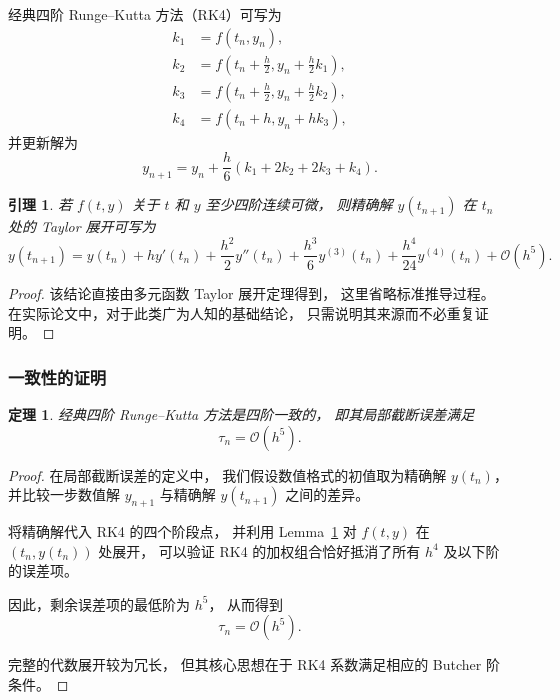 \documentclass[UTF8, a4paper, zihao=-4]{ctexart} %
\newtheorem{theorem}{定理}[section]%
\newtheorem{lemma}{引理}[section]
\numberwithin{equation}{section}%
\begin{document}
经典四阶 Runge--Kutta 方法（RK4）可写为
\begin{align}
k_1 &= f(t_n, y_n), \\
k_2 &= f\left(t_n + \tfrac{h}{2}, y_n + \tfrac{h}{2} k_1 \right), \\
k_3 &= f\left(t_n + \tfrac{h}{2}, y_n + \tfrac{h}{2} k_2 \right), \\
k_4 &= f\left(t_n + h, y_n + h k_3 \right),
\end{align}
并更新解为
\begin{equation}
y_{n+1} = y_n + \frac{h}{6}(k_1 + 2k_2 + 2k_3 + k_4).
\end{equation}

\begin{lemma}
\label{lem:taylor}
若 $f(t,y)$ 关于 $t$ 和 $y$ 至少四阶连续可微，
则精确解 $y(t_{n+1})$ 在 $t_n$ 处的 Taylor 展开可写为
\[
y(t_{n+1}) = y(t_n) + h y'(t_n) + \frac{h^2}{2} y''(t_n)
+ \frac{h^3}{6} y^{(3)}(t_n)
+ \frac{h^4}{24} y^{(4)}(t_n)
+ \mathcal{O}(h^5).
\]
\end{lemma}

\begin{proof}
该结论直接由多元函数 Taylor 展开定理得到，
这里省略标准推导过程。
在实际论文中，对于此类广为人知的基础结论，
只需说明其来源而不必重复证明。
\end{proof}

\subsubsection*{一致性的证明}

\begin{theorem}
\label{thm:rk4_consistency}
经典四阶 Runge--Kutta 方法是四阶一致的，
即其局部截断误差满足
\[
\tau_n = \mathcal{O}(h^5).
\]
\end{theorem}

\begin{proof}
在局部截断误差的定义中，
我们假设数值格式的初值取为精确解 $y(t_n)$，
并比较一步数值解 $y_{n+1}$ 与精确解 $y(t_{n+1})$ 之间的差异。

将精确解代入 RK4 的四个阶段点，
并利用 Lemma~\ref{lem:taylor} 对 $f(t,y)$ 在 $(t_n, y(t_n))$ 处展开，
可以验证 RK4 的加权组合恰好抵消了所有 $h^4$ 及以下阶的误差项。

因此，剩余误差项的最低阶为 $h^5$，
从而得到
\[
\tau_n = \mathcal{O}(h^5).
\]

完整的代数展开较为冗长，
但其核心思想在于 RK4 系数满足相应的 Butcher 阶条件。
\end{proof}
\end{document}
